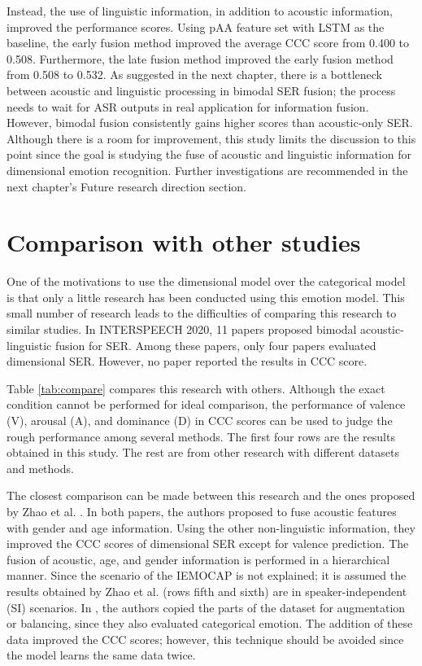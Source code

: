 Instead, the use of linguistic information, in addition to acoustic
information, improved the performance scores. Using pAA feature set with LSTM
as the baseline, the early fusion method improved the average CCC score from
0.400 to 0.508.  Furthermore, the late fusion method improved the early fusion
method from 0.508 to 0.532. As suggested in the next chapter, there is a
bottleneck between acoustic and linguistic processing in bimodal SER fusion;
the process needs to wait for ASR outputs in real application for information
fusion. However, bimodal fusion consistently gains higher scores than
acoustic-only SER. Although there is a room for improvement, this study limits
the discussion to this point since the goal is studying the fuse of acoustic
and linguistic information for dimensional emotion recognition.  Further
investigations are recommended in the next chapter's Future research direction
section. 


\section{Comparison with other studies}
One of the motivations to use the dimensional model over the categorical model
is that only a little research has been conducted using this emotion model.
This small number of research leads to the difficulties of comparing this
research to similar studies. In INTERSPEECH 2020, 11 papers proposed bimodal
acoustic-linguistic fusion for SER. Among these papers, only four papers
evaluated dimensional SER.  However, no paper reported the results in CCC
score.  

Table \ref{tab:compare} compares this research with others. Although the exact
condition cannot be performed for ideal comparison, the performance of valence
(V), arousal (A), and dominance (D) in CCC scores can be used to judge the
rough performance among several methods. The first four rows are the results
obtained in this study. The rest are from other research with different
datasets and methods.

The closest comparison can be made between this research and the ones proposed
by Zhao et al. \cite{Zhao2018a,Zhang2019}. In both papers, the authors proposed
to fuse acoustic features with gender and age information. Using the other
non-linguistic information, they improved the CCC scores of dimensional SER
except for valence prediction. The fusion of acoustic, age, and gender
information is performed in a hierarchical manner. Since the scenario of the
IEMOCAP is not explained; it is assumed the results obtained by Zhao et al.
(rows fifth and sixth) are in speaker-independent (SI) scenarios. In
\cite{Zhao2019}, the authors copied the parts of the dataset for augmentation or
balancing, since they also evaluated categorical emotion. The addition of these
data improved the CCC scores; however, this technique should be avoided since
the model learns the same data twice.

